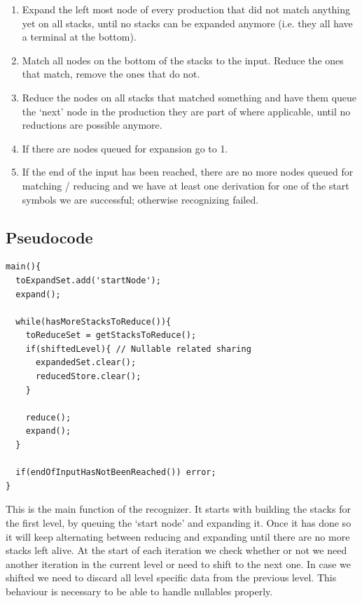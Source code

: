 \documentclass[a4paper,10pt]{article}
\begin{document}
\begin{enumerate}
 \setlength{\itemsep}{0pt}
 \setlength{\parskip}{0pt}
 \setlength{\parsep}{0pt}

 \item Expand the left most node of every production that did not match anything yet on all stacks, until no stacks can be expanded anymore (i.e. they all have a terminal at the bottom).
 \item Match all nodes on the bottom of the stacks to the input. Reduce the ones that match, remove the ones that do not.
 \item Reduce the nodes on all stacks that matched something and have them queue the `next' node in the production they are part of where applicable, until no reductions are possible anymore.
 \item If there are nodes queued for expansion go to 1.
 \item If the end of the input has been reached, there are no more nodes queued for matching / reducing and we have at least one derivation for one of the start symbols we are successful; otherwise recognizing failed.
\end{enumerate}

\pagebreak
\subsection{Pseudocode}

{\small
\begin{verbatim}
main(){
  toExpandSet.add('startNode');
  expand();
  
  while(hasMoreStacksToReduce()){
    toReduceSet = getStacksToReduce();
    if(shiftedLevel){ // Nullable related sharing
      expandedSet.clear();
      reducedStore.clear();
    }
    
    reduce();
    expand();
  }
  
  if(endOfInputHasNotBeenReached()) error;
}
\end{verbatim}
}

This is the main function of the recognizer. It starts with building the stacks for the first level, by queuing the `start node' and expanding it. Once it has done so it will keep alternating between reducing and expanding until there are no more stacks left alive. At the start of each iteration we check whether or not we need another iteration in the current level or need to shift to the next one. In case we shifted we need to discard all level specific data from the previous level. This behaviour is necessary to be able to handle nullables properly.
\end{document}
